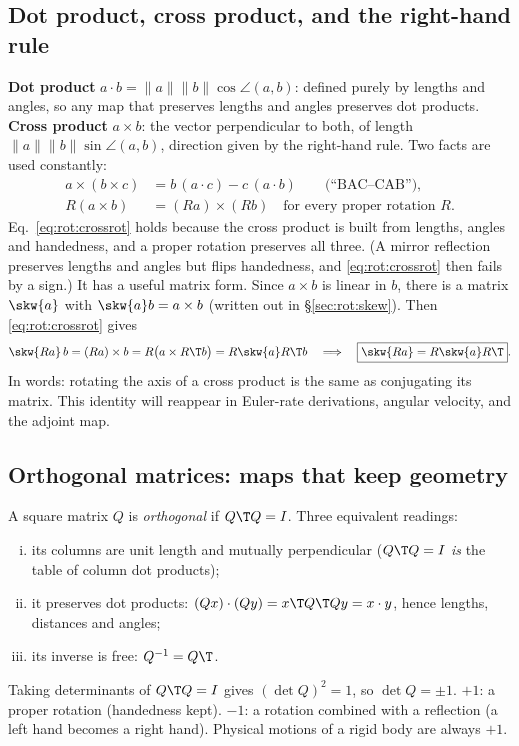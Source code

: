 \subsection{Dot product, cross product, and the right-hand rule}\label{sec:rot:dot-product-cross}
\textbf{Dot product} $a\cdot b=\|a\|\|b\|\cos\angle(a,b)$: defined purely by lengths and angles, so any map that preserves lengths and angles preserves dot products. \textbf{Cross product} $a\times b$: the vector perpendicular to both, of length $\|a\|\|b\|\sin\angle(a,b)$, direction given by the right-hand rule. Two facts are used constantly:
\begin{align}
a\times(b\times c) &= b\,(a\cdot c) - c\,(a\cdot b) \qquad\text{(``BAC--CAB'')},\label{eq:rot:bac}\\
R(a\times b) &= (Ra)\times(Rb)\quad\text{for every proper rotation } R. \label{eq:rot:crossrot}
\end{align}
Eq.~\eqref{eq:rot:crossrot} holds because the cross product is built from lengths, angles and handedness, and a proper rotation preserves all three. (A mirror reflection preserves lengths and angles but flips handedness, and \eqref{eq:rot:crossrot} then fails by a sign.) It has a useful matrix form. Since $a\times b$ is linear in $b$, there is a matrix $\skw{a}$ with $\skw{a}b=a\times b$ (written out in \S\ref{sec:rot:skew}). Then \eqref{eq:rot:crossrot} gives
\begin{equation}
\skw{Ra}\,b=(Ra)\times b = R\big(a\times R\T b\big)=R\skw{a}R\T b\quad\Longrightarrow\quad \boxed{\skw{Ra}=R\skw{a}R\T}. \label{eq:rot:conj}
\end{equation}
In words: rotating the axis of a cross product is the same as conjugating its matrix. This identity will reappear in Euler-rate derivations, angular velocity, and the adjoint map.

\subsection{Orthogonal matrices: maps that keep geometry}\label{sec:rot:orthogonal-matrices-maps}
A square matrix $Q$ is \emph{orthogonal} if $Q\T Q=I$. Three equivalent readings:
\begin{enumerate}[(i)]
\item its columns are unit length and mutually perpendicular ($Q\T Q=I$ \emph{is} the table of column dot products);
\item it preserves dot products: $(Qx)\cdot(Qy)=x\T Q\T Qy=x\cdot y$, hence lengths, distances and angles;
\item its inverse is free: $Q^{-1}=Q\T$.
\end{enumerate}
Taking determinants of $Q\T Q=I$ gives $(\det Q)^2=1$, so $\det Q=\pm1$. $+1$: a proper rotation (handedness kept). $-1$: a rotation combined with a reflection (a left hand becomes a right hand). Physical motions of a rigid body are always $+1$.

